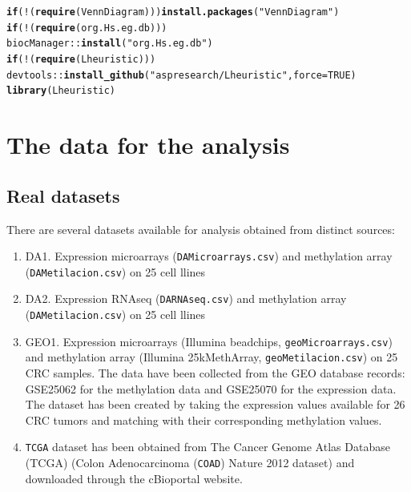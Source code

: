 \documentclass[a4paper,10pt]{article}\usepackage[]{graphicx}\usepackage[]{xcolor}
\makeatletter
\newcommand{\hlnum}[1]{\textcolor[rgb]{0.686,0.059,0.569}{#1}}%
\newcommand{\hlstr}[1]{\textcolor[rgb]{0.192,0.494,0.8}{#1}}%
\newcommand{\hlopt}[1]{\textcolor[rgb]{0,0,0}{#1}}%
\newcommand{\hlstd}[1]{\textcolor[rgb]{0.345,0.345,0.345}{#1}}%
\newcommand{\hlkwa}[1]{\textcolor[rgb]{0.161,0.373,0.58}{\textbf{#1}}}%
\newcommand{\hlkwc}[1]{\textcolor[rgb]{0.333,0.667,0.333}{#1}}%
\newcommand{\hlkwd}[1]{\textcolor[rgb]{0.737,0.353,0.396}{\textbf{#1}}}%
\newenvironment{kframe}{%
 \def\at@end@of@kframe{}%
 \ifinner\ifhmode%
  \def\at@end@of@kframe{\end{minipage}}%
  \begin{minipage}{\columnwidth}%
 \fi\fi%
 \def\FrameCommand##1{\hskip\@totalleftmargin \hskip-\fboxsep
 \colorbox{shadecolor}{##1}\hskip-\fboxsep
     \hskip-\linewidth \hskip-\@totalleftmargin \hskip\columnwidth}%
 \MakeFramed {\advance\hsize-\width
   \@totalleftmargin\z@ \linewidth\hsize
   \@setminipage}}%
 {\par\unskip\endMakeFramed%
 \at@end@of@kframe}
\newenvironment{knitrout}{}{} %
\makeatother
\begin{document}
\begin{knitrout}
\color{fgcolor}\begin{kframe}
\begin{alltt}
\hlkwa{if} \hlstd{(}\hlopt{!}\hlstd{(}\hlkwd{require}\hlstd{(VennDiagram)))} \hlkwd{install.packages}\hlstd{(}\hlstr{"VennDiagram"}\hlstd{)}
\hlkwa{if} \hlstd{(}\hlopt{!}\hlstd{(}\hlkwd{require}\hlstd{(org.Hs.eg.db)))}
  \hlstd{biocManager}\hlopt{::}\hlkwd{install}\hlstd{(}\hlstr{"org.Hs.eg.db"}\hlstd{)}
\hlkwa{if}\hlstd{(}\hlopt{!}\hlstd{(}\hlkwd{require}\hlstd{(Lheuristic)))}
  \hlstd{devtools}\hlopt{::}\hlkwd{install_github}\hlstd{(}\hlstr{"aspresearch/Lheuristic"}\hlstd{,} \hlkwc{force}\hlstd{=}\hlnum{TRUE}\hlstd{)}
\hlkwd{library}\hlstd{(Lheuristic)}
\end{alltt}
\end{kframe}
\end{knitrout}

\section{The data for the analysis}

\subsection{Real datasets}

There are several datasets available for analysis obtained from distinct sources:
\begin{enumerate}
  \item DA1. Expression microarrays (\texttt{DAMicroarrays.csv}) and methylation array (\texttt{DAMetilacion.csv}) on 25 cell llines
  \item DA2. Expression RNAseq (\texttt{DARNAseq.csv}) and methylation array (\texttt{DAMetilacion.csv}) on 25 cell llines
  \item GEO1. Expression microarrays (Illumina beadchips, \texttt{geoMicroarrays.csv}) and methylation array (Illumina 25kMethArray, \texttt{geoMetilacion.csv}) on 25 CRC samples. The data have been collected from the GEO database records: GSE25062 for the methylation data and GSE25070 for the expression data. The dataset has been created by taking the expression values available for 26 CRC tumors and matching with their corresponding methylation values.
\item \texttt{TCGA} dataset has been obtained from The Cancer Genome Atlas Database (TCGA) (Colon Adenocarcinoma (\texttt{COAD}) Nature 2012 dataset) and downloaded through the cBioportal website.
\end{enumerate}
\end{document}
